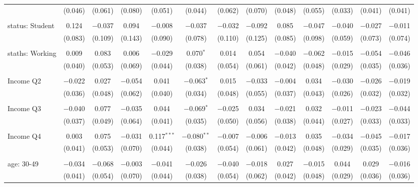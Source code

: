 \begin{tabular}{@{\extracolsep{5pt}}lcccccccccccc}
  & (0.046) & (0.061) & (0.080) & (0.051) & (0.044) & (0.062) & (0.070) & (0.048) & (0.055) & (0.033) & (0.041) & (0.041) \\ 
  & & & & & & & & & & & & \\ 
 status: Student & 0.124 & $-$0.037 & 0.094 & $-$0.008 & $-$0.037 & $-$0.032 & $-$0.092 & 0.085 & $-$0.047 & $-$0.040 & $-$0.027 & $-$0.011 \\ 
  & (0.083) & (0.109) & (0.143) & (0.090) & (0.078) & (0.110) & (0.125) & (0.085) & (0.098) & (0.059) & (0.073) & (0.074) \\ 
  & & & & & & & & & & & & \\ 
 staths: Working & 0.009 & 0.083 & 0.006 & $-$0.029 & 0.070$^{*}$ & 0.014 & 0.054 & $-$0.040 & $-$0.062 & $-$0.015 & $-$0.054 & $-$0.046 \\ 
  & (0.040) & (0.053) & (0.069) & (0.044) & (0.038) & (0.054) & (0.061) & (0.042) & (0.048) & (0.029) & (0.035) & (0.036) \\ 
  & & & & & & & & & & & & \\ 
 Income Q2 & $-$0.022 & 0.027 & $-$0.054 & 0.041 & $-$0.063$^{*}$ & 0.015 & $-$0.033 & $-$0.004 & 0.034 & $-$0.030 & $-$0.026 & $-$0.019 \\ 
  & (0.036) & (0.048) & (0.062) & (0.040) & (0.034) & (0.048) & (0.055) & (0.037) & (0.043) & (0.026) & (0.032) & (0.032) \\ 
  & & & & & & & & & & & & \\ 
 Income Q3 & $-$0.040 & 0.077 & $-$0.035 & 0.044 & $-$0.069$^{*}$ & $-$0.025 & 0.034 & $-$0.021 & 0.032 & $-$0.011 & $-$0.023 & $-$0.044 \\ 
  & (0.037) & (0.049) & (0.064) & (0.041) & (0.035) & (0.050) & (0.056) & (0.038) & (0.044) & (0.027) & (0.033) & (0.033) \\ 
  & & & & & & & & & & & & \\ 
 Income Q4 & 0.003 & 0.075 & $-$0.031 & 0.117$^{***}$ & $-$0.080$^{**}$ & $-$0.007 & $-$0.006 & $-$0.013 & 0.035 & $-$0.034 & $-$0.045 & $-$0.017 \\ 
  & (0.041) & (0.053) & (0.070) & (0.044) & (0.038) & (0.054) & (0.061) & (0.042) & (0.048) & (0.029) & (0.035) & (0.036) \\ 
  & & & & & & & & & & & & \\ 
 age: 30-49 & $-$0.034 & $-$0.068 & $-$0.003 & $-$0.041 & $-$0.026 & $-$0.040 & $-$0.018 & 0.027 & $-$0.015 & 0.044 & 0.029 & $-$0.016 \\ 
  & (0.041) & (0.054) & (0.070) & (0.044) & (0.038) & (0.054) & (0.062) & (0.042) & (0.048) & (0.029) & (0.036) & (0.036) \\ 

\end{tabular}
